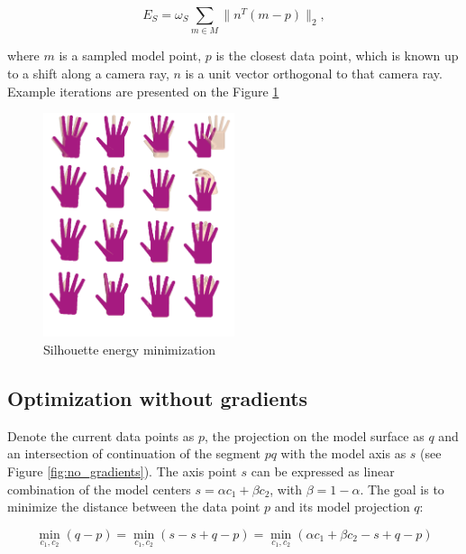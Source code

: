 \documentclass[tog]{acmsiggraph}
\begin{document}
\begin{equation}
	E_{S} = \omega_S \sum_{m \in M} \| n^T(m - p)\|_2,
\end{equation}

where $m$ is a sampled model point, $p$ is the closest data point, which is known up to a shift along a camera ray, $n$ is a unit vector orthogonal to that camera ray. Example iterations are presented on the Figure \ref{fig:silhouette}

\begin{figure}[h!] 
	\centering
	\hspace{0em}
	\includegraphics[width=0.5\textwidth]{fig/silhouette}
	\caption{Silhouette energy minimization}
	\label{fig:silhouette}
\end{figure}

\subsection{Optimization without gradients}

Denote the current data points as $p$, the projection on the model surface as $q$ and an intersection of continuation of the segment $pq$ with the model axis as $s$ (see Figure \ref{fig:no_gradients}). The axis point $s$ can be expressed as linear combination of the model centers $s = \alpha c_1 + \beta c_2$, with $\beta = 1 - \alpha$. 
The goal is to minimize the distance between the data point $p$ and its model projection $q$:

\begin{equation}
\min_{c_1, c_2} (q - p) = \min_{c_1, c_2} (s - s + q - p) = \min_{c_1, c_2} (\alpha c_1 + \beta c_2 - s + q - p)
\end{equation}
\end{document}
